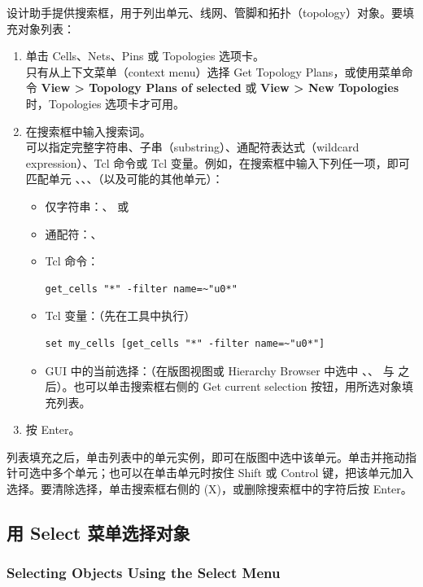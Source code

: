 设计助手提供搜索框，用于列出单元、线网、管脚和拓扑（topology）对象。要填充对象列表：
\begin{enumerate}
  \item 单击 Cells、Nets、Pins 或 Topologies 选项卡。\\
        只有从上下文菜单（context menu）选择 Get Topology Plans，或使用菜单命令 \textbf{View > Topology Plans of selected} 或 \textbf{View > New Topologies} 时，Topologies 选项卡才可用。
  \item 在搜索框中输入搜索词。\\
        可以指定完整字符串、子串（substring）、通配符表达式（wildcard expression）、Tcl 命令或 Tcl 变量。例如，在搜索框中输入下列任一项，即可匹配单元 、、、（以及可能的其他单元）：
        \begin{itemize}
          \item 仅字符串：、 或 
          \item 通配符：、
          \item Tcl 命令：
\begin{lstlisting}
get_cells "*" -filter name=~"u0*"
\end{lstlisting}
          \item Tcl 变量：（先在工具中执行）
\begin{lstlisting}
set my_cells [get_cells "*" -filter name=~"u0*"]
\end{lstlisting}
          \item GUI 中的当前选择：（在版图视图或 Hierarchy Browser 中选中 、、 与  之后）。也可以单击搜索框右侧的 Get current selection 按钮，用所选对象填充列表。
        \end{itemize}
  \item 按 Enter。
\end{enumerate}

列表填充之后，单击列表中的单元实例，即可在版图中选中该单元。单击并拖动指针可选中多个单元；也可以在单击单元时按住 Shift 或 Control 键，把该单元加入选择。要清除选择，单击搜索框右侧的 (X)，或删除搜索框中的字符后按 Enter。

\subsection{用 Select 菜单选择对象}
\subsubsection*{Selecting Objects Using the Select Menu}

